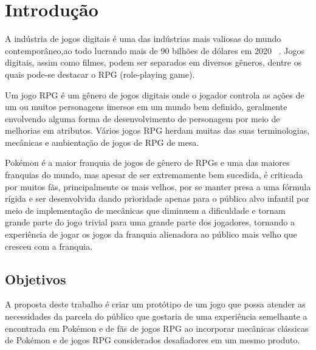 
\chapter{Introdução}

A indústria de jogos digitais é uma das indústrias mais valiosas do mundo contemporâneo,ao todo lucrando mais de 90 bilhões de dólares em 2020 ~\cite{Techjury}. Jogos digitais, assim como filmes, podem ser separados em diversos gêneros, dentre os quais pode-se destacar o RPG (role-playing game).

Um jogo RPG é um gênero de jogos digitais onde o jogador controla as ações de um ou muitos personagens imersos em um mundo bem definido, geralmente envolvendo alguma forma de desenvolvimento de personagem por meio de melhorias em atributos. Vários jogos RPG herdam muitas das suas terminologias, mecânicas e ambientação de jogos de RPG de mesa. ~\cite{Wiki01}
	
Pokémon é a maior franquia de jogos de gênero de RPGs e uma das maiores franquias do mundo, mas apesar de ser extremamente bem sucedida, é criticada por muitos fãs, principalmente os mais velhos, por se manter presa a uma fórmula rígida e ser desenvolvida dando prioridade apenas para o público alvo infantil por meio de implementação de mecânicas que diminuem a dificuldade e tornam grande parte do jogo trivial para uma grande parte dos jogadores, tornando a experiência de jogar os jogos da franquia alienadora ao público mais velho que cresceu com a franquia.


\section{Objetivos}

A proposta deste trabalho é criar um protótipo de um jogo que possa atender as necessidades da parcela do público que gostaria de uma experiência semelhante a encontrada em Pokémon e de fãs de jogos RPG ao incorporar mecânicas clássicas de Pokémon e de jogos RPG considerados desafiadores em um mesmo produto.


